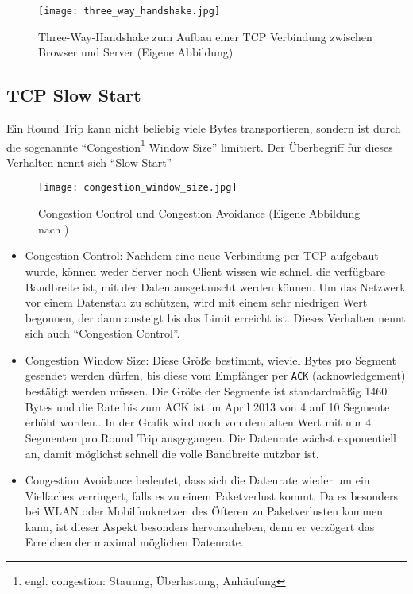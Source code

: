 		\begin{figure}[htbp]
			\begin{center}
				\texttt{[image: three\_way\_handshake.jpg]}
				\caption{Three-Way-Handshake zum Aufbau einer TCP Verbindung zwischen Browser und Server (Eigene Abbildung)}
				\label{fig:three_way_handshake}
			\end{center}
		\end{figure}

	\subsection{TCP Slow Start} %
	\label{sub:tcp_slow_start}

		Ein Round Trip kann nicht beliebig viele Bytes transportieren, sondern ist durch die sogenannte "`Congestion\footnote{engl. congestion: Stauung, Überlastung, Anhäufung} Window Size"' limitiert. Der Überbegriff für dieses Verhalten nennt sich "`Slow Start"'

		\begin{figure}[htbp]
			\begin{center}
				\texttt{[image: congestion\_window\_size.jpg]}
				\caption{Congestion Control und Congestion Avoidance (Eigene Abbildung nach \autocite{grigorikSlowStart})}
				\label{fig:congestion_window_size}
			\end{center}
		\end{figure} 

		\begin{itemize}
			\item Congestion Control: Nachdem eine neue Verbindung per TCP aufgebaut wurde, können weder Server noch Client wissen wie schnell die verfügbare Bandbreite ist, mit der Daten ausgetauscht werden können. Um das Netzwerk vor einem Datenstau zu schützen, wird mit einem sehr niedrigen Wert begonnen, der dann ansteigt bis das Limit erreicht ist. Dieses Verhalten nennt sich auch "`Congestion Control"'.

			\item Congestion Window Size: Diese Größe bestimmt, wieviel Bytes pro Segment gesendet werden dürfen, bis diese vom Empfänger per \texttt{ACK} (acknowledgement) bestätigt werden müssen. Die Größe der Segmente ist standardmäßig 1460 Bytes und die Rate bis zum ACK ist im April 2013 von 4 auf 10 Segmente erhöht worden.\autocite{grigorikSlowStart}. In der Grafik wird noch von dem alten Wert mit nur 4 Segmenten pro Round Trip ausgegangen. Die Datenrate wächst exponentiell an, damit möglichst schnell die volle Bandbreite nutzbar ist.

			\item Congestion Avoidance bedeutet, dass sich die Datenrate wieder um ein Vielfaches verringert, falls es zu einem Paketverlust kommt. Da es besonders bei WLAN oder Mobilfunknetzen des Öfteren zu Paketverlusten kommen kann, ist dieser Aspekt besonders hervorzuheben, denn er verzögert das Erreichen der maximal möglichen Datenrate.
		\end{itemize}

